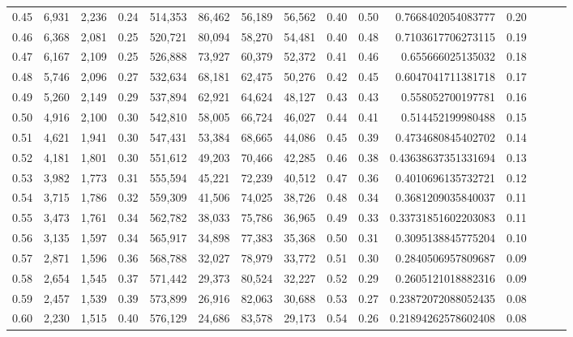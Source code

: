 \begin{tabular}{rrrrrrrrrrrrrrr}
0.45 &   6,931 &  2,236 &  0.24 &  514,353 &   86,462 &   56,189 &   56,562 &  0.40 &  0.50 &    0.7668402054083777 &      0.20 \\
0.46 &   6,368 &  2,081 &  0.25 &  520,721 &   80,094 &   58,270 &   54,481 &  0.40 &  0.48 &    0.7103617706273115 &      0.19 \\
0.47 &   6,167 &  2,109 &  0.25 &  526,888 &   73,927 &   60,379 &   52,372 &  0.41 &  0.46 &     0.655666025135032 &      0.18 \\
0.48 &   5,746 &  2,096 &  0.27 &  532,634 &   68,181 &   62,475 &   50,276 &  0.42 &  0.45 &    0.6047041711381718 &      0.17 \\
0.49 &   5,260 &  2,149 &  0.29 &  537,894 &   62,921 &   64,624 &   48,127 &  0.43 &  0.43 &     0.558052700197781 &      0.16 \\
0.50 &   4,916 &  2,100 &  0.30 &  542,810 &   58,005 &   66,724 &   46,027 &  0.44 &  0.41 &     0.514452199980488 &      0.15 \\
0.51 &   4,621 &  1,941 &  0.30 &  547,431 &   53,384 &   68,665 &   44,086 &  0.45 &  0.39 &    0.4734680845402702 &      0.14 \\
0.52 &   4,181 &  1,801 &  0.30 &  551,612 &   49,203 &   70,466 &   42,285 &  0.46 &  0.38 &   0.43638637351331694 &      0.13 \\
0.53 &   3,982 &  1,773 &  0.31 &  555,594 &   45,221 &   72,239 &   40,512 &  0.47 &  0.36 &    0.4010696135732721 &      0.12 \\
0.54 &   3,715 &  1,786 &  0.32 &  559,309 &   41,506 &   74,025 &   38,726 &  0.48 &  0.34 &    0.3681209035840037 &      0.11 \\
0.55 &   3,473 &  1,761 &  0.34 &  562,782 &   38,033 &   75,786 &   36,965 &  0.49 &  0.33 &   0.33731851602203083 &      0.11 \\
0.56 &   3,135 &  1,597 &  0.34 &  565,917 &   34,898 &   77,383 &   35,368 &  0.50 &  0.31 &    0.3095138845775204 &      0.10 \\
0.57 &   2,871 &  1,596 &  0.36 &  568,788 &   32,027 &   78,979 &   33,772 &  0.51 &  0.30 &    0.2840506957809687 &      0.09 \\
0.58 &   2,654 &  1,545 &  0.37 &  571,442 &   29,373 &   80,524 &   32,227 &  0.52 &  0.29 &    0.2605121018882316 &      0.09 \\
0.59 &   2,457 &  1,539 &  0.39 &  573,899 &   26,916 &   82,063 &   30,688 &  0.53 &  0.27 &   0.23872072088052435 &      0.08 \\
0.60 &   2,230 &  1,515 &  0.40 &  576,129 &   24,686 &   83,578 &   29,173 &  0.54 &  0.26 &   0.21894262578602408 &      0.08 \\

\end{tabular}
